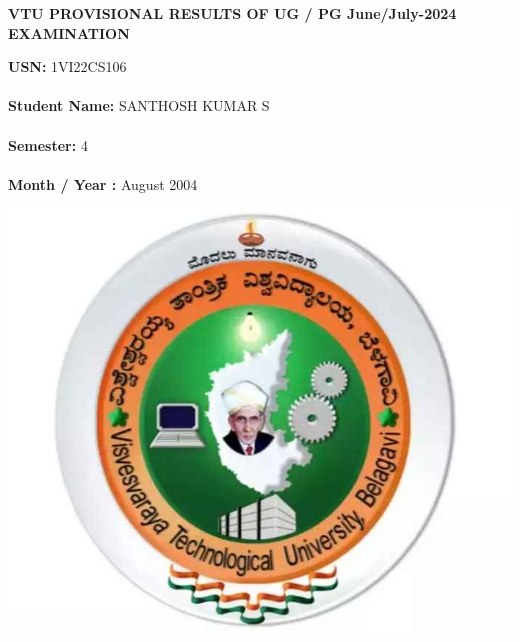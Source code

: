 \documentclass[a4paper,12pt]{article}
\begin{document}
\begin{center}
    \textbf{VTU PROVISIONAL RESULTS OF UG / PG June/July-2024 EXAMINATION}
\end{center}

\vspace{0.5cm}

\noindent
\begin{minipage}{0.7\textwidth}
\textbf{USN:} 1VI22CS106 \\\\
\textbf{Student Name:} SANTHOSH KUMAR S\\\\
\textbf{Semester: } 4\\\\
\textbf{Month / Year :  }August 2004
\end{minipage}
\begin{minipage}{0.2\textwidth}
    \includegraphics[width=\textwidth]{vtulogo.jpg} %
\end{minipage}
\vspace{0.5cm}

\noindent

\end{document}
